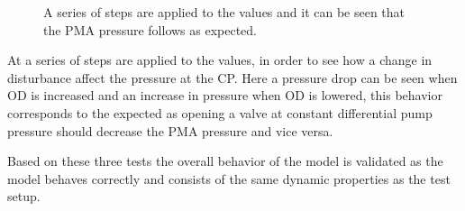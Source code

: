 \begin{figure}[H]
   \centering
    
    \caption{A series of steps are applied to the values and it can be seen that the PMA pressure follows as expected.}
    \label{disturbance_simulation}
\end{figure}

At  a series of steps are applied to the values, in order to see how a change in disturbance affect the pressure at the CP. Here a pressure drop can be seen when OD is increased and an increase in pressure when OD is lowered, this behavior corresponds to the expected as opening a valve at constant differential pump pressure should decrease the PMA pressure and vice versa.

Based on these three tests the overall behavior of the model is validated as the model behaves correctly and consists of the same dynamic properties as the test setup.   